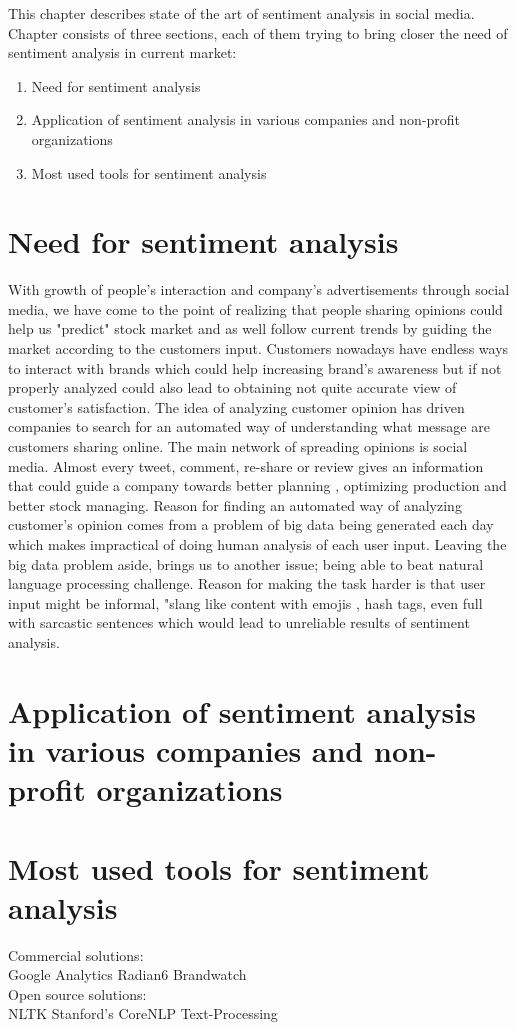 This chapter describes state of the art of sentiment analysis in social media.
Chapter consists of three sections, each of them trying to bring closer the need of sentiment analysis in current market:

\begin{enumerate}
	\item Need for sentiment analysis
	\item Application of sentiment analysis in various companies and non-profit organizations
	\item Most used tools for sentiment analysis
\end{enumerate}

\section{Need for sentiment analysis}
With growth of people's interaction and company's advertisements through social media, we have come to the point of realizing that people sharing opinions could help us "predict" stock market and as well follow current trends by guiding the market according to the customers input.
Customers nowadays have endless ways to interact with brands which could help increasing brand's awareness but if not properly analyzed could also lead to obtaining not quite accurate view of customer's satisfaction.
The idea of analyzing customer opinion has driven companies to search for an automated way of understanding what message are customers sharing online. The main network of spreading opinions is social media. Almost every tweet, comment, re-share or  review gives an information that could guide a company towards better planning , optimizing production and better stock managing.
Reason for finding an automated way of analyzing customer's opinion comes from a problem of big data being generated each day which makes impractical of doing human analysis of each user input. Leaving the big data problem aside, brings us to another issue; being able to beat natural language processing challenge. Reason for making the task harder is that user input might be informal, "slang like content with emojis , hash tags, even full with sarcastic sentences which would lead to unreliable results of sentiment analysis.

\section{Application of sentiment analysis in various companies and non-profit organizations}
\Blindtext

\section{Most used tools for sentiment analysis}

Commercial solutions:\\

Google Analytics
Radian6
Brandwatch\\

Open source solutions:\\

NLTK 
Stanford's CoreNLP
Text-Processing\\

\Blindtext
